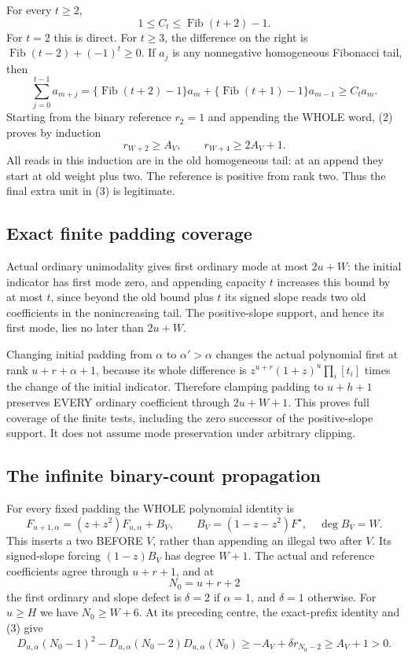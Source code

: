 For every $t\ge2$,
\[
       1\le C_t\le\operatorname{Fib}(t+2)-1.             \tag{1}
\]
For $t=2$ this is direct. For $t\ge3$, the difference on the right
is $\operatorname{Fib}(t-2)+(-1)^t\ge0$.
If $a_j$ is any nonnegative homogeneous Fibonacci tail, then
\[
 \sum_{j=0}^{t-1}a_{m+j}
 =\{\operatorname{Fib}(t+2)-1\}a_m
  +\{\operatorname{Fib}(t+1)-1\}a_{m-1}
 \ge C_ta_m.                                             \tag{2}
\]
Starting from the binary reference $r_2=1$ and appending the WHOLE
word, (2) proves by induction
\[
            r_{W+2}\ge A_V,\qquad
            r_{W+4}\ge2A_V+1.                            \tag{3}
\]
All reads in this induction are in the old homogeneous tail: at an
append they start at old weight plus two. The reference is positive
from rank two. Thus the final extra unit in (3) is legitimate.

\subsection*{Exact finite padding coverage}
Actual ordinary unimodality gives first ordinary mode at most
$2u+W$: the initial indicator has first mode zero, and appending
capacity $t$ increases this bound by at most $t$, since beyond the
old bound plus $t$ its signed slope reads two old coefficients in
the nonincreasing tail. The positive-slope support, and hence its
first mode, lies no later than $2u+W$.

Changing initial padding from $\alpha$ to $\alpha'>\alpha$ changes
the actual polynomial first at rank $u+r+\alpha+1$, because its
whole difference is $z^{u+r}(1+z)^u\prod_i[t_i]$ times the change
of the initial indicator. Therefore clamping padding to
$u+h+1$ preserves EVERY ordinary coefficient through $2u+W+1$.
This proves full coverage of the finite tests, including the zero
successor of the positive-slope support. It does not assume mode
preservation under arbitrary clipping.

\subsection*{The infinite binary-count propagation}
For every fixed padding the WHOLE polynomial identity is
\[
 F_{u+1,\alpha}=(z+z^2)F_{u,\alpha}+B_V,\qquad
 B_V=(1-z-z^2)F^\star,\quad \deg B_V=W.                  \tag{4}
\]
This inserts a two BEFORE $V$, rather than appending an illegal
two after $V$. Its signed-slope forcing $(1-z)B_V$ has degree
$W+1$. The actual and reference coefficients agree through
$u+r+1$, and at
\[
             N_0=u+r+2
\]
the first ordinary and slope defect is $\delta=2$ if $\alpha=1$,
and $\delta=1$ otherwise.
For $u\ge H$ we have $N_0\ge W+6$. At its preceding centre,
the exact-prefix identity and (3) give
\[
 D_{u,\alpha}(N_0-1)^2
 -D_{u,\alpha}(N_0-2)D_{u,\alpha}(N_0)
 \ge -A_V+\delta r_{N_0-2}\ge A_V+1>0.                 \tag{5}
\]

